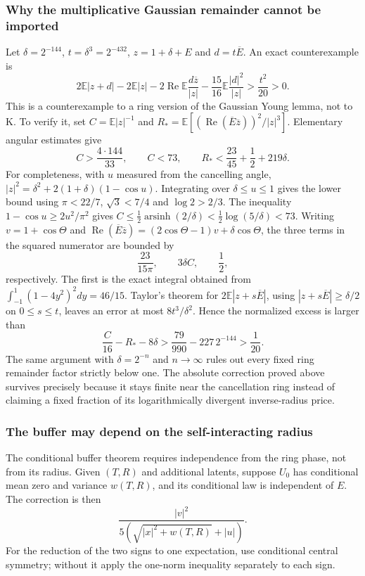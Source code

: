 \subsubsection{Why the multiplicative Gaussian remainder cannot be imported}
Let $\delta=2^{-144}$, $t=\delta^3=2^{-432}$, $z=1+\delta+E$ and $d=t\overline E$. An exact counterexample is
\[
2\mathbb E|z+d|-2\mathbb E|z|
 -2\operatorname{Re}\mathbb E\frac{d\overline z}{|z|}
 -\frac{15}{16}\mathbb E\frac{|d|^2}{|z|}
 >\frac{t^2}{20}>0.
\]
This is a counterexample to a ring version of the Gaussian Young lemma, not to K. To verify it, set $C=\mathbb E|z|^{-1}$ and
$R_*=\mathbb E[(\operatorname{Re}(\overline E\overline z))^2/|z|^3]$.
Elementary angular estimates give
\[
C>\frac{4\cdot144}{33},\qquad C<73,\qquad
R_*<\frac{23}{45}+\frac12+219\delta.
\]
For completeness, with $u$ measured from the cancelling angle,
$|z|^2=\delta^2+2(1+\delta)(1-\cos u)$.
Integrating over $\delta\le u\le1$ gives the lower bound using
$\pi<22/7$, $\sqrt3<7/4$ and $\log2>2/3$.
The inequality $1-\cos u\ge2u^2/\pi^2$ gives
$C\le\frac12\operatorname{arsinh}(2/\delta)<\frac12\log(5/\delta)<73$.
Writing $v=1+\cos\Theta$ and
$\operatorname{Re}(\overline E\overline z)=(2\cos\Theta-1)v+\delta\cos\Theta$, the three terms in the squared numerator are bounded by
\[
\frac{23}{15\pi},\qquad3\delta C,\qquad\frac12,
\]
respectively. The first is the exact integral obtained from
$\int_{-1}^1(1-4y^2)^2dy=46/15$.
Taylor's theorem for $2\mathbb E|z+s\overline E|$, using $|z+s\overline E|\ge\delta/2$ on $0\le s\le t$, leaves an error at most $8t^3/\delta^2$. Hence the normalized excess is larger than
\[
\frac{C}{16}-R_*-8\delta
>\frac{79}{990}-227\,2^{-144}>\frac1{20}.
\]
The same argument with $\delta=2^{-n}$ and $n\to\infty$ rules out every fixed ring remainder factor strictly below one. The absolute correction proved above survives precisely because it stays finite near the cancellation ring instead of claiming a fixed fraction of its logarithmically divergent inverse-radius price.

\subsubsection{The buffer may depend on the self-interacting radius}
The conditional buffer theorem requires independence from the ring phase, not from its radius. Given $(T,R)$ and additional latents, suppose $U_0$ has conditional mean zero and variance $w(T,R)$, and its conditional law is independent of $E$. The correction is then
\[
\frac{|v|^2}{5(\sqrt{|x|^2+w(T,R)}+|u|)}.
\]
For the reduction of the two signs to one expectation, use conditional central symmetry; without it apply the one-norm inequality separately to each sign.

